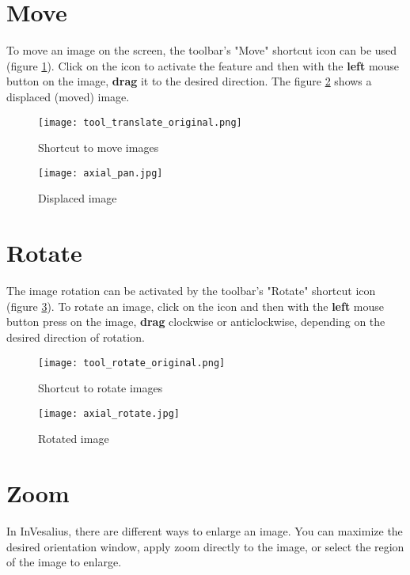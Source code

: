 \section{Move}

To move an image on the screen, the toolbar's "Move" shortcut icon can be used (figure
\ref{fig:move_icon}). Click on the icon to activate the feature and then with the \textbf{left} mouse button on the image, \textbf{drag} it to the desired direction. The figure \ref{fig:move_img} shows a displaced (moved) image.

\begin{figure}[!htb]
\centering
\texttt{[image: tool\_translate\_original.png]}
\caption{Shortcut to move images}
\label{fig:move_icon}
\end{figure}

\begin{figure}[!htb]
\centering
\texttt{[image: axial\_pan.jpg]}
\caption{Displaced image}
\label{fig:move_img}
\end{figure}

\section{Rotate}

The image rotation can be activated by the toolbar's "Rotate" shortcut icon (figure \ref{fig:rot_icon}). To rotate an image, click on the icon and then with the \textbf{left} mouse button press on the image, \textbf{drag} clockwise or anticlockwise, depending on the desired direction of rotation.

\begin{figure}[!htb]
\centering
\texttt{[image: tool\_rotate\_original.png]}
\caption{Shortcut to rotate images}
\label{fig:rot_icon}
\end{figure}

\begin{figure}[!htb]
\centering
\texttt{[image: axial\_rotate.jpg]}
\caption{Rotated image}
\label{fig:rotate_all}
\end{figure}

\section{Zoom}

In InVesalius, there are different ways to enlarge an image. You can maximize the desired orientation window, apply zoom directly to the image, or select the region of the image to enlarge.

